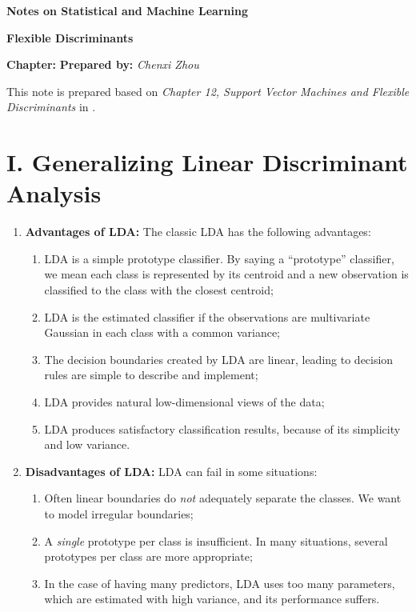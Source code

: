 \documentclass[12pt]{article}
\newcommand{\titlebox}[4]{
\begin{tcolorbox}[colback = blue!5!white!95, colframe = blue!70!black
]
  \noindent \textbf{ #1 } \hfill \textit{#2} 
  \begin{center}
  	 \LARGE{\textbf{#3}}
  \end{center}
\textbf{Chapter:} \textit{\text{#4}} \hfill \textbf{Prepared by:} \textit{Chenxi Zhou}
\end{tcolorbox}
}
\begin{document}
\titlebox{Notes on Statistical and Machine Learning}{}{Flexible Discriminants}{17}
\thispagestyle{plain}

\vspace{10pt}

This note is prepared based on \textit{Chapter 12, Support Vector Machines and Flexible Discriminants} in \textcites{Friedman2001-np}. 

\section*{I. Generalizing Linear Discriminant Analysis}

\begin{enumerate}[label=\textbf{\arabic*.}]

	\item \textbf{Advantages of LDA:} The classic LDA has the following advantages: 
	\begin{enumerate}
		\item LDA is a simple prototype classifier. By saying a ``prototype'' classifier, we mean each class is represented by its centroid and a new observation is classified to the class with the closest centroid; 
		\item LDA is the estimated classifier if the observations are multivariate Gaussian in each class with a common variance; 
		\item The decision boundaries created by LDA are linear, leading to decision rules are simple to describe and implement; 
		\item LDA provides natural low-dimensional views of the data; 
		\item LDA produces satisfactory classification results, because of its simplicity and low variance. 
	\end{enumerate}
	
	\item \textbf{Disadvantages of LDA:} LDA can fail in some situations: 
	\begin{enumerate}
		\item Often linear boundaries do \emph{not} adequately separate the classes. We want to model irregular boundaries; 
		\item A \emph{single} prototype per class is insufficient. In many situations, several prototypes per class are more appropriate; 
		\item In the case of having many predictors, LDA uses too many parameters, which are estimated with high variance, and its performance suffers. 
	\end{enumerate}
	

\end{enumerate}
\end{document}
